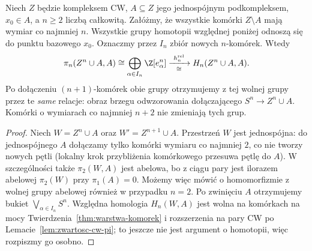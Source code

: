 \begin{lemat}
\label{lem:pierwsze-komorki-pi}
Niech $Z$ będzie kompleksem CW,
$A\subseteq Z$ jego jednospójnym podkompleksem,
$x_0\in A$, a $n\geq2$ liczbą całkowitą.
Załóżmy, że wszystkie komórki
$Z\setminus A$ mają wymiar co najmniej $n$.
Wszystkie grupy homotopii względnej poniżej
odnoszą się do punktu bazowego $x_0$.
Oznaczmy przez $I_n$
zbiór nowych $n$-komórek.
Wtedy
\[
 \pi_n(Z^n\cup A,A)
 \cong\bigoplus_{\alpha\in I_n}\Z[e_\alpha^n]
 \xrightarrow[\cong]{\ h_n^{\mathrm{rel}}\ }
 H_n(Z^n\cup A,A).
\]
Po dołączeniu $(n+1)$-komórek
obie grupy otrzymujemy
z tej wolnej grupy przez
te \emph{same} relacje:
obraz brzegu odwzorowania
dołączającego $S^n\to
Z^n\cup A$. Komórki
o wymiarach co najmniej
$n+2$ nie zmieniają
tych grup.
\end{lemat}
\begin{proof}
Niech $W=Z^n\cup A$ oraz $W'=Z^{n+1}\cup A$.
Przestrzeń $W$ jest jednospójna: do jednospójnego $A$
dołączamy tylko komórki wymiaru co najmniej $2$, co nie tworzy
nowych pętli (lokalny krok przybliżenia komórkowego przesuwa pętlę do $A$).
W szczególności także $\pi_2(W,A)$ jest abelowa, bo z ciągu pary
jest ilorazem abelowej $\pi_2(W)$ przy $\pi_1(A)=0$.
Możemy więc mówić o homomorfizmie z wolnej grupy abelowej
również w przypadku $n=2$.
Po zwinięciu $A$
otrzymujemy bukiet
$\bigvee_{\alpha\in I_n}S^n$.
Względna homologia
$H_n(W,A)$ jest
wolna na komórkach
na mocy
Twierdzenia~\ref{thm:warstwa-komorek}
i rozszerzenia na pary CW po Lemacie~\ref{lem:zwartosc-cw-pi};
to jeszcze nie jest
argument o homotopii,
więc rozpiszmy go
osobno.


\end{proof}
